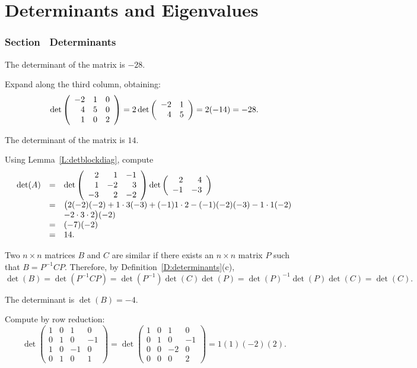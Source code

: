 \chapter{Determinants and Eigenvalues}

\subsection*{Section~\protect{\ref{S:det}} Determinants}

\ans The determinant of the matrix is $-28$.

\soln Expand along the third column, obtaining:
\[
\det\left(\begin{array}{rrr} -2 & 1 & 0 \\ 4 & 5 & 0 \\ 1 & 0 & 2\end{array}\right) = 2\det\left(\begin{array}{rr} -2 & 1\\ 4 &5\end{array}\right)
= 2(-14) = -28.
\]

\ans The determinant of the matrix is $14$.

\soln Using Lemma~\ref{L:detblockdiag}, compute
\[ 
\begin{array}{rcl}
\det(A) & = & 
\det\left(\begin{array}{rrr} 2 & 1 & -1 \\ 1 & -2 & 3 \\ -3 & 2 & -2\end{array}\right)
\det\left(\begin{array}{rr} 2 & 4\\ -1 &-3\end{array}\right) \\
& = & \big(2(-2)(-2) + 1 \cdot 3(-3) + (-1)1 \cdot 2
- (-1)(-2)(-3) - 1 \cdot 1(-2) \\
& & - 2 \cdot 3 \cdot 2\big)
(-2) \\
& = & (-7)(-2) \\
& = & 14.
\end{array}
\]

Two $n \times n$ matrices $B$ and $C$ are similar if there exists
an $n \times n$ matrix $P$ such that $B = P^{-1}CP$.  Therefore, by
Definition~\ref{D:determinants}(c),
\[
\det(B) = \det(P^{-1}CP)
= \det(P^{-1})\det(C)\det(P)
= \det(P)^{-1}\det(P)\det(C)
= \det(C).
\]

\ans The determinant is $\det(B) = -4$.

\soln Compute by row reduction:
\[
\det\left(\begin{array}{rrrr}
1 & 0 & 1 & 0 \\
0 & 1 & 0 & -1 \\
1 & 0 & -1 & 0 \\
0 & 1 & 0 & 1 \end{array}\right)
= \det\left(\begin{array}{rrrr}
1 & 0 & 1 & 0 \\
0 & 1 & 0 & -1 \\
0 & 0 & -2 & 0 \\
0 & 0 & 0 & 2 \end{array}\right)
= 1(1)(-2)(2).
\]

